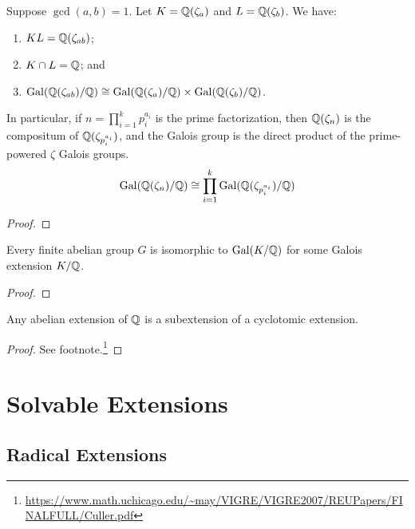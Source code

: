 \begin{proposition}
    Suppose \(\gcd(a,b) = 1\).
    Let \(K = \mathbb{Q}(\zeta_a)\) and \(L = \mathbb{Q}(\zeta_b)\).
    We have:
    \begin{enumerate}[label={(\alph*)}, itemsep=0mm]
        \item \(KL = \mathbb{Q}(\zeta_{ab})\);
        \item \(K \cap L = \mathbb{Q}\); and
        \item \(\operatorname{Gal}(\mathbb{Q}(\zeta_{ab})/\mathbb{Q}) \cong \operatorname{Gal}(\mathbb{Q}(\zeta_a)/\mathbb{Q}) \times \operatorname{Gal}(\mathbb{Q}(\zeta_b)/\mathbb{Q})\).
    \end{enumerate}
    In particular, if \(n = \prod_{i=1}^k p_i^{a_i}\) is the prime factorization,
    then \(\mathbb{Q}(\zeta_n)\) is the compositum of \(\mathbb{Q}(\zeta_{p_i^{a_i}})\),
    and the Galois group is the direct product of the prime-powered \(\zeta\) Galois groups.
    \begin{equation*}
        \operatorname{Gal}(\mathbb{Q}(\zeta_n)/\mathbb{Q}) \cong \prod_{i=1}^k \operatorname{Gal}(\mathbb{Q}(\zeta_{p_i^{a_i}})/\mathbb{Q})
    \end{equation*}
\end{proposition}
\begin{proof}
\end{proof}

\begin{theorem}
    Every finite abelian group \(G\) is isomorphic to \(\operatorname{Gal}(K/\mathbb{Q})\)
    for some Galois extension \(K/\mathbb{Q}\).
\end{theorem}
\begin{proof}
\end{proof}

\begin{theorem}
    Any abelian extension of \(\mathbb{Q}\)
    is a subextension of a cyclotomic extension.
\end{theorem}
\begin{proof}
    See footnote.\footnote{%
        \url{https://www.math.uchicago.edu/~may/VIGRE/VIGRE2007/REUPapers/FINALFULL/Culler.pdf}
    }
\end{proof}


\section{Solvable Extensions}

\subsection*{Radical Extensions}

